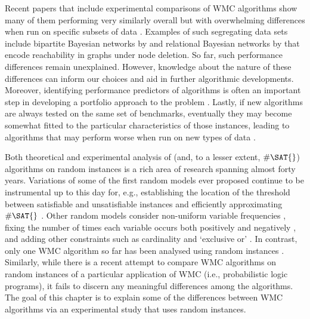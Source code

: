 Recent papers that include experimental comparisons of \textsf{WMC}
algorithms show many of them performing very similarly
overall \citep{DBLP:conf/aaai/DudekPV20,DBLP:conf/cp/DudekPV20} but with
overwhelming differences when run on specific subsets of
data \citep{DBLP:conf/uai/DilkasB21,DBLP:conf/sat/DilkasB21,DBLP:conf/ijcai/LagniezM17}.
Examples of such segregating data sets include bipartite Bayesian networks by
\citet{DBLP:conf/aaai/SangBK05} and
relational Bayesian networks by
\citet{DBLP:journals/ijar/ChaviraDJ06}
that encode reachability in graphs under node deletion. So far, such performance
differences remain unexplained. However, knowledge about the nature of these
differences can inform our choices and aid in further algorithmic developments.
Moreover, identifying performance predictors of algorithms is often an important
step in developing a portfolio approach to the
problem \citep{DBLP:journals/jair/XuHHL08}. Lastly, if new algorithms are always
tested on the same set of benchmarks, eventually they may become somewhat fitted
to the particular characteristics of those instances, leading to algorithms that
may perform worse when run on new types of
data \citep{DBLP:conf/cec/HossainALA10}.

Both theoretical and experimental analysis of \SAT{} (and, to a lesser extent,
$\#\SAT{}$) algorithms on random instances is a rich area of research spanning
almost forty years. Variations of some of the first random models ever
proposed \citep{DBLP:journals/dam/FrancoP83,DBLP:journals/siamcomp/PurdomB83}
continue to be instrumental up to this day for, e.g., establishing the location
of the threshold between satisfiable and unsatisfiable
instances \citep{DBLP:conf/focs/AchlioptasM02} and efficiently approximating
$\#\SAT{}$ \citep{DBLP:conf/icalp/GalanisG0Y20}. Other random models consider
non-uniform variable frequencies \citep{DBLP:conf/ijcai/AnsoteguiBL09}, fixing
the number of times each variable occurs both positively and
negatively \citep{DBLP:journals/cpc/Coja-OghlanW18}, and adding other constraints
such as cardinality and `exclusive or' \citep{DBLP:conf/ijcai/PoteJM19}. In
contrast, only one \textsf{WMC} algorithm so far has been analysed using random
instances \citep{DBLP:conf/sat/SangBBKP04,DBLP:conf/sat/SangBK05}. Similarly,
while there is a recent attempt \citep{DBLP:conf/cp/DilkasB20} to compare
\textsf{WMC} algorithms on random instances of a particular application of
\textsf{WMC} (i.e., probabilistic logic programs), it fails to discern any
meaningful differences among the algorithms. The goal of this chapter is to
explain some of the differences between \textsf{WMC} algorithms via an
experimental study that uses random instances.

